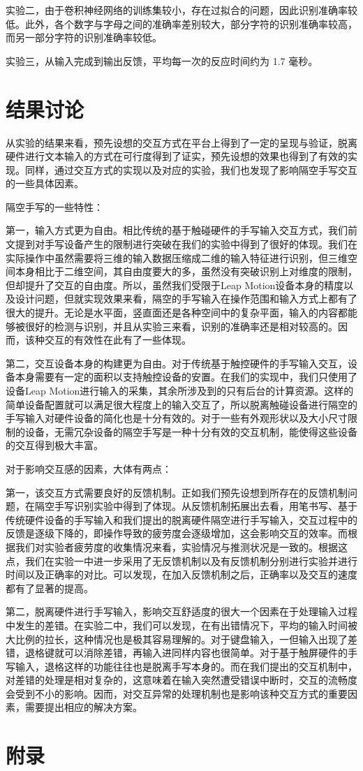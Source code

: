 \documentclass[10pt, twocolumn]{article}
\begin{document}
实验二，由于卷积神经网络的训练集较小，存在过拟合的问题，因此识别准确率较低。此外，各个数字与字母之间的准确率差别较大，部分字符的识别准确率较高，而另一部分字符的识别准确率较低。

实验三，从输入完成到输出反馈，平均每一次的反应时间约为 1.7 毫秒。

\section{结果讨论}
从实验的结果来看，预先设想的交互方式在平台上得到了一定的呈现与验证，脱离硬件进行文本输入的方式在可行度得到了证实，预先设想的效果也得到了有效的实现。同样，通过交互方式的实现以及对应的实验，我们也发现了影响隔空手写交互的一些具体因素。

隔空手写的一些特性：

第一，输入方式更为自由。相比传统的基于触碰硬件的手写输入交互方式，我们前文提到对手写设备产生的限制进行突破在我们的实验中得到了很好的体现。我们在实际操作中虽然需要将三维的输入数据压缩成二维的输入特征进行识别，但三维空间本身相比于二维空间，其自由度要大的多，虽然没有突破识别上对维度的限制，但却提升了交互的自由度。所以，虽然我们受限于Leap Motion设备本身的精度以及设计问题，但就实现效果来看，隔空的手写输入在操作范围和输入方式上都有了很大的提升。无论是水平面，竖直面还是各种空间中的复杂平面，输入的内容都能够被很好的检测与识别，并且从实验三来看，识别的准确率还是相对较高的。因而，该种交互的有效性在此有了一些体现。

第二，交互设备本身的构建更为自由。对于传统基于触控硬件的手写输入交互，设备本身需要有一定的面积以支持触控设备的安置。在我们的实现中，我们只使用了设备Leap Motion进行输入的采集，其余所涉及到的只有后台的计算资源。这样的简单设备配置就可以满足很大程度上的输入交互了，所以脱离触碰设备进行隔空的手写输入对硬件设备的简化也是十分有效的。对于一些有外观形状以及大小尺寸限制的设备，无需冗杂设备的隔空手写是一种十分有效的交互机制，能使得这些设备的交互得到极大丰富。

对于影响交互感的因素，大体有两点：

第一，该交互方式需要良好的反馈机制。正如我们预先设想到所存在的反馈机制问题，在隔空手写识别实验中得到了体现。从反馈机制拓展出去看，用笔书写、基于传统硬件设备的手写输入和我们提出的脱离硬件隔空进行手写输入，交互过程中的反馈是逐级下降的，即操作导致的疲劳度会逐级增加，这会影响交互的效率。而根据我们对实验者疲劳度的收集情况来看，实验情况与推测状况是一致的。根据这点，我们在实验一中进一步采用了无反馈机制以及有反馈机制分别进行实验并进行时间以及正确率的对比。可以发现，在加入反馈机制之后，正确率以及交互的速度都有了显著的提高。

第二，脱离硬件进行手写输入，影响交互舒适度的很大一个因素在于处理输入过程中发生的差错。在实验二中，我们可以发现，在有出错情况下，平均的输入时间被大比例的拉长，这种情况也是极其容易理解的。对于键盘输入，一但输入出现了差错，退格键就可以消除差错，再输入进同样内容也很简单。对于基于触屏硬件的手写输入，退格这样的功能往往也是脱离手写本身的。而在我们提出的交互机制中，对差错的处理是相对复杂的，这意味着在输入突然遭受错误中断时，交互的流畅度会受到不小的影响。因而，对交互异常的处理机制也是影响该种交互方式的重要因素，需要提出相应的解决方案。


\section{附录}
\end{document}

